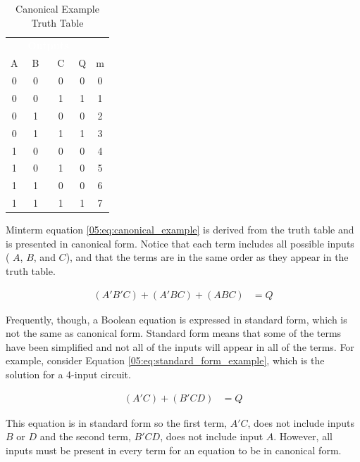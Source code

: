 \begin{table}[H]
  \sffamily
  \newcommand{\head}[1]{\textcolor{white}{\textbf{#1}}}    
  \begin{center}
    \begin{tabular}{ccc|cc} 
      \rowcolor{black!75}
      \multicolumn{3}{c}{\head{Inputs}} & \multicolumn{2}{c}{\head{Outputs}} \\
      A & B & C & Q & m \\
      \hline
      0 & 0 & 0 & 0 & 0 \\
      0 & 0 & 1 & 1 & 1 \\
      0 & 1 & 0 & 0 & 2 \\
      0 & 1 & 1 & 1 & 3 \\
      1 & 0 & 0 & 0 & 4 \\
      1 & 0 & 1 & 0 & 5 \\
      1 & 1 & 0 & 0 & 6 \\
      1 & 1 & 1 & 1 & 7 
    \end{tabular}
  \end{center}
  \caption{Canonical Example Truth Table}
  \label{05:tab:canonical_example_truth_table}
\end{table}

Minterm equation \ref{05:eq:canonical_example} is derived from the truth table and is presented in canonical form. Notice that each term includes all possible inputs ( $ A $,  $ B $, and  $ C $), and that the terms are in the same order as they appear in the truth table. 

\begin{align}
  \label{05:eq:canonical_example}
  (A'B'C)+(A'BC)+(ABC) &= Q
\end{align}

Frequently, though, a Boolean equation is expressed in standard form, which is not the same as canonical form. Standard form means that some of the terms have been simplified and not all of the inputs will appear in all of the terms. For example, consider Equation \ref{05:eq:standard_form_example}, which is the solution for a 4-input circuit.

\begin{align}
  \label{05:eq:standard_form_example}
  (A'C)+(B'CD) &= Q
\end{align}

This equation is in standard form so the first term, $ A'C $, does not include inputs  $ B $ or  $ D $ and the second term, $ B'CD $, does not include input  $ A $. However, all inputs must be present in every term for an equation to be in canonical form.

